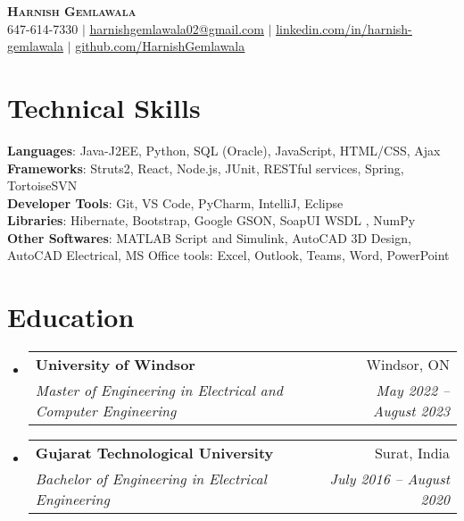 \documentclass[letterpaper,11pt]{article}
\makeatletter
\newcommand{\resumeSubheading}[4]{
  \vspace{-2pt}\item
    \begin{tabular*}{0.97\textwidth}[t]{l@{\extracolsep{\fill}}r}
      \textbf{#1} & #2 \\
      \textit{\small#3} & \textit{\small #4} \\
    \end{tabular*}\vspace{-7pt}
}
\newcommand{\resumeSubHeadingListStart}{\begin{itemize}[leftmargin=0.15in, label={}]}
\newcommand{\resumeSubHeadingListEnd}{\end{itemize}}
\makeatother
\begin{document}

\begin{center}
    \textbf{\Huge \scshape Harnish Gemlawala} \\ \vspace{3pt}
    \small 647-614-7330 $|$ \href{mailto:harnishgemlawala02@gmail.com}{\underline{harnishgemlawala02@gmail.com}} $|$ 
    \href{https://www.linkedin.com/in/harnish-gemlawala-25a866135/}{\underline{linkedin.com/in/harnish-gemlawala}} $|$
    \href{https://github.com/HarnishGemlawala}{\underline{github.com/HarnishGemlawala}}
\end{center}

\section{Technical Skills}
 \begin{itemize}[leftmargin=0.15in, label={}]
    \small{\item{
     \textbf{Languages}{: Java-J2EE, Python, SQL (Oracle), JavaScript, HTML/CSS, Ajax} \\
     \textbf{Frameworks}{: Struts2, React, Node.js, JUnit, RESTful services, Spring, TortoiseSVN } \\
     \textbf{Developer Tools}{: Git, VS Code, PyCharm, IntelliJ, Eclipse} \\
     \textbf{Libraries}{: Hibernate, Bootstrap, Google GSON, SoapUI WSDL , NumPy }\\
     \textbf{Other Softwares}{: MATLAB Script and Simulink, AutoCAD 3D Design, AutoCAD Electrical, MS Office tools: Excel, Outlook, Teams, Word, PowerPoint }
    }}
 \end{itemize}



\section{Education}
  \resumeSubHeadingListStart
    \resumeSubheading
      {University of Windsor}{Windsor, ON}
      {Master of Engineering in Electrical and Computer Engineering}{May 2022 -- August 2023}
    \resumeSubheading
      {Gujarat Technological University}{Surat, India}
      {Bachelor of Engineering in Electrical Engineering}{July 2016 -- August 2020}
  \resumeSubHeadingListEnd
\end{document}
